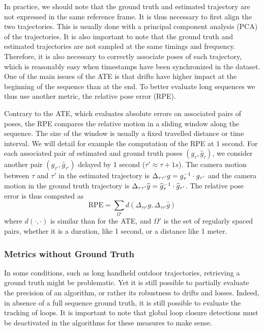 In practice, we should note that the ground truth and estimated trajectory
are not expressed in the same reference frame.
It is thus necessary to first align the two trajectories.
This is usually done with a principal component analysis (PCA)
of the trajectories.
It is also important to note that the ground truth and estimated trajectories
are not sampled at the same timings and frequency.
Therefore, it is also necessary to correctly associate poses of each trajectory,
which is reasonably easy when timestamps have been synchronized in the dataset.
One of the main issues of the ATE is that drifts have higher impact at the beginning
of the sequence than at the end.
To better evaluate long sequences we thus use another metric,
the relative pose error (RPE).

Contrary to the ATE, which evaluates absolute errors on associated pairs of poses,
the RPE compares the relative motion in a sliding window along the sequence.
The size of the window is usually a fixed travelled distance or time interval.
We will detail for example the computation of the RPE at 1 second.
For each associated pair of estimated and ground truth poses $(g_{\tau}, \widehat{g}_{\tau})$,
we consider another pair $(g_{\tau'}, \widehat{g}_{\tau'})$
delayed by 1 second ($\tau' \approx \tau + 1s$).
The camera motion between $\tau$ and $\tau'$ in the estimated trajectory is
$\Delta_{\tau \tau'} g = g_{\tau}^{-1} \cdot g_{\tau'}$
and the camera motion in the ground truth trajectory is
$\Delta_{\tau \tau'} \widehat{g} = \widehat{g}_{\tau}^{-1} \cdot \widehat{g}_{\tau'}$.
The relative pose error is thus computed as
\[
	\text{RPE} = \sum_{\Omega'} d(\Delta_{\tau \tau'} g, \Delta_{\tau \tau'} \widehat{g})
\]
where $d(\cdot, \cdot)$ is similar than for the ATE,
and $\Omega'$ is the set of regularly spaced pairs,
whether it is a duration, like 1 second, or a distance like 1 meter.


\subsubsection{Metrics without Ground Truth}%
\label{ssub:metrics_no_gt}

In some conditions, such as long handheld outdoor trajectories,
retrieving a ground truth might be problematic.
Yet it is still possible to partially evaluate the precision of an algorithm,
or rather its robustness to drifts and losses.
Indeed, in absence of a full sequence ground truth,
it is still possible to evaluate the tracking of loops.
It is important to note that global loop closure detections must
be deactivated in the algorithms for these measures to make sense.

